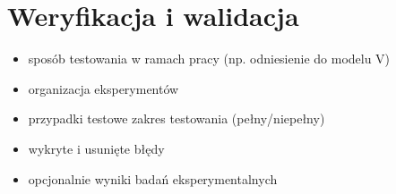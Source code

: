 \documentclass[a4paper,twoside,12pt]{book}
\newcounter{stronyPozaNumeracja}
\begin{document}
\pagestyle{tylkoNumeryStron}
\tableofcontents

\setcounter{stronyPozaNumeracja}{\value{page}}
\mainmatter
\pagestyle{empty}






















\chapter{Weryfikacja i walidacja}
\begin{itemize}
\item sposób testowania w ramach pracy (np. odniesienie do modelu V)
\item organizacja eksperymentów
\item przypadki testowe zakres testowania (pełny/niepełny)
\item wykryte i usunięte błędy
\item opcjonalnie wyniki badań eksperymentalnych
\end{itemize}
\end{document}
